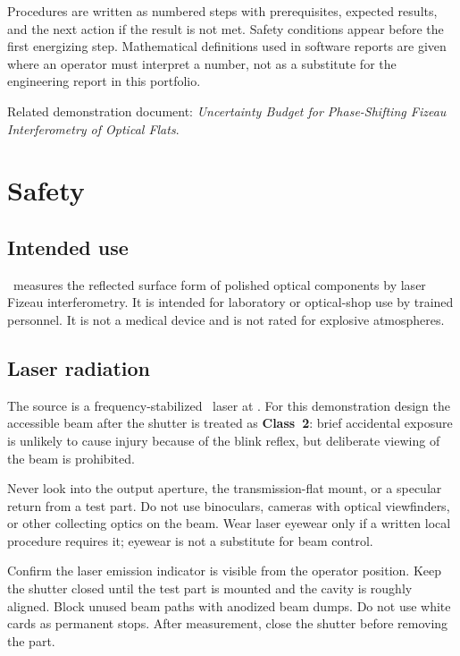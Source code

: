 \begin{notebox}
Procedures are written as numbered steps with prerequisites, expected results, and the next action if the result is not met. Safety conditions appear before the first energizing step. Mathematical definitions used in software reports are given where an operator must interpret a number, not as a substitute for the engineering report in this portfolio.
\end{notebox}

Related demonstration document: \emph{Uncertainty Budget for Phase-Shifting Fizeau Interferometry of Optical Flats}.

\chapter{Safety}

\section{Intended use}

\instrument\ measures the reflected surface form of polished optical components by laser Fizeau interferometry. It is intended for laboratory or optical-shop use by trained personnel. It is not a medical device and is not rated for explosive atmospheres.

\section{Laser radiation}

The source is a frequency-stabilized \HeNe\ laser at \wavelength. For this demonstration design the accessible beam after the shutter is treated as \textbf{Class~2}: brief accidental exposure is unlikely to cause injury because of the blink reflex, but deliberate viewing of the beam is prohibited.

\begin{warningbox}
Never look into the output aperture, the transmission-flat mount, or a specular return from a test part. Do not use binoculars, cameras with optical viewfinders, or other collecting optics on the beam. Wear laser eyewear only if a written local procedure requires it; eyewear is not a substitute for beam control.
\end{warningbox}

\resetsteps
\stepn Confirm the laser emission indicator is visible from the operator position.
\stepn Keep the shutter closed until the test part is mounted and the cavity is roughly aligned.
\stepn Block unused beam paths with anodized beam dumps. Do not use white cards as permanent stops.
\stepn After measurement, close the shutter before removing the part.

